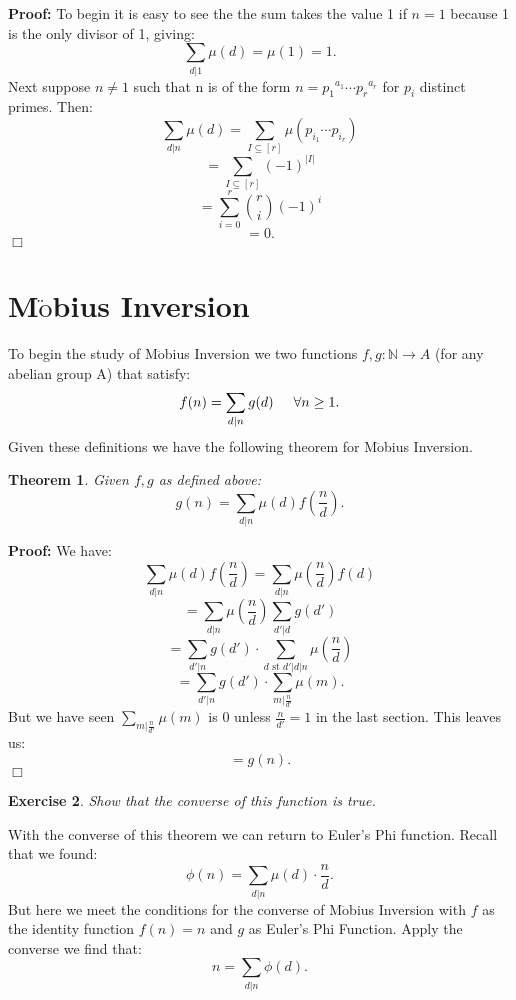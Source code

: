 \documentclass[11pt]{article}
\newtheorem{theorem}{Theorem}
\newtheorem{exercise}[theorem]{Exercise}
\newenvironment{proof}{\noindent \textbf{Proof:}}{$\Box$}
\newcommand{\ignore}[1]{} %
\begin{document}
\begin{proof}
To begin it is easy to see the the sum takes the value 1 if $n=1$ because 1 is the only divisor of 1, giving:
	\[\sum_{d|1} \mu(d)=\mu(1)=1.\]
Next suppose $n \neq 1$ such that n is of the form $n={p_1}^{a_1} \cdots {p_r}^{a_r}$ for $p_i$ distinct primes. Then:
	\[\sum_{d|n} \mu(d)=\sum_{I \subseteq [r]} \mu(p_{i_1}\cdots p_{i_r})\]
	\[=\sum_{I \subseteq [r]} (-1)^{|I|}\]
	\[=\sum_{i=0}^{r} {r \choose i} (-1)^i\]
	\[=0.\]
\end{proof}

\section{M$\ddot{\mbox{o}}$bius Inversion}
To begin the study of M$\ddot{\mbox{o}}$bius Inversion we two functions $f,g: \mathbb{N}\rightarrow A$ (for any abelian group A) that satisfy:
	\[f(n)=\sum_{d|n}g(d) \hspace{5 mm} \forall n\geq 1.\]
Given these definitions we have the following theorem for M$\ddot{\mbox{o}}$bius Inversion.
	
\begin{theorem}
Given $f,g$ as defined above:
	\[g(n)=\sum_{d|n} \mu(d) f(\frac{n}{d}).\]
\end{theorem}

\begin{proof}
We have:
	\[\sum_{d|n} \mu(d) f(\frac{n}{d})=\sum_{d|n} \mu(\frac{n}{d})f(d)\]
	\[=\sum_{d|n} \mu(\frac{n}{d}) \sum_{d'|d}g(d')\]
	\[=\sum_{d'|n}g(d')\cdot \sum_{d \mbox{ st } d'|d|n} \mu(\frac{n}{d})\]
	\[=\sum_{d'|n}g(d')\cdot \sum_{m|\frac{n}{d'}} \mu(m).\]
But we have seen $\sum_{m|\frac{n}{d'}} \mu(m)$ is 0 unless $\frac{n}{d'}=1$ in the last section. This leaves us:
	\[=g(n).\]
\end{proof}

\begin{exercise}
Show that the converse of this function is true.
\end{exercise}

With the converse of this theorem we can return to Euler's Phi function. Recall that we found:
	\[\phi(n)=\sum_{d|n}\mu(d)\cdot \frac{n}{d}.\]
But here we meet the conditions for the converse of M$\ddot{\mbox{o}}$bius Inversion with $f$ as the identity function $f(n)=n$ and $g$ as Euler's Phi Function. Apply the converse we find that:
	\[n=\sum_{d|n}\phi(d).\]
\ignore{This sentence won't appear in the latex output.} %
\end{document}
